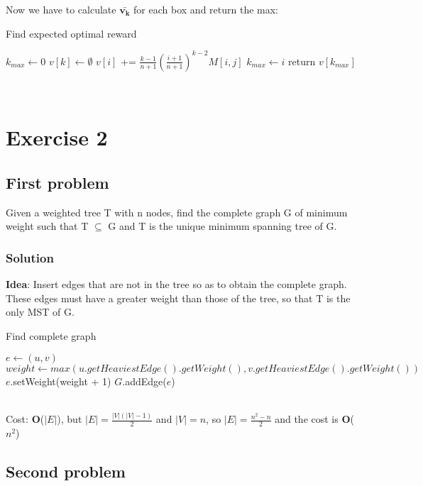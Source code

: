 \documentclass[11pt]{article}
\begin{document}
Now we have to calculate $\mathbf{\bar{v_k}}$ for each box and return the max:
\begin{algorithm}
	\caption{Find expected optimal reward}\label{euclid}
	\begin{algorithmic}[1]
		\State $k_{max} \gets 0$
		\State $v[k] \gets \emptyset$
		\State $v[i]$ += $\frac{k-1}{n+1}(\frac{i+1}{n+1})^{k-2}M[i,j]$
		\EndFor
		\State $k_{max} \gets i$
		\EndIf	
		\EndFor
		\State return $v[k_{max}]$
	\end{algorithmic}
\end{algorithm}\\
\newpage

\section*{Exercise 2}
\subsection*{First problem}
Given a weighted tree T with n nodes, find the complete graph G of minimum weight such that T $\subseteq$ G and T is the unique minimum spanning tree of G.
\subsubsection*{Solution}
\textbf{Idea}: 
Insert edges that are not in the tree so as to obtain the complete graph. These edges must have a greater weight than those of the tree, so that T is the only MST of G. \\
\begin{algorithm}
	\caption{Find complete graph}\label{euclid}
	\begin{algorithmic}[1]
			\State $e \gets (u,v)$
					\State $weight \gets max(u.getHeaviestEdge().getWeight(), v.getHeaviestEdge().getWeight())$
					\State $e$.setWeight(weight + 1)
					\State $G$.addEdge($e$)
				\EndIf
			\EndFor		
		\EndFor
	\end{algorithmic}
\end{algorithm} \\
Cost: \textbf{O}($|E|$), but $|E| = \frac{|V|(|V| - 1)}{2}$ and $|V| = n$, so $|E| = \frac{n^2 - n}{2}$ and the cost is \textbf{O}($n^2$)
\subsection*{Second problem}
\end{document}
